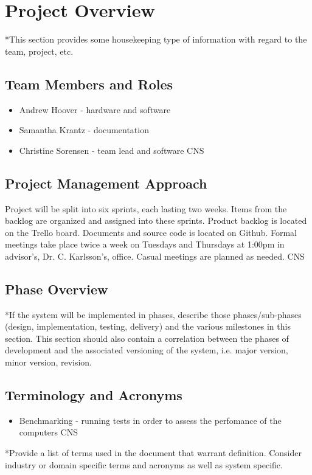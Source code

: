 

\chapter{Project Overview}
*This section provides some housekeeping type of information with regard to the 
team, project, etc. 



\section{Team Members and Roles}
\begin{itemize}
	\item Andrew Hoover - hardware and software
	\item Samantha Krantz - documentation
	\item Christine Sorensen - team lead and software CNS
\end{itemize}

\section{Project  Management Approach}
Project will be split into six sprints, each lasting two weeks. Items from the backlog are organized and assigned into these sprints. \newline \newline Product backlog is located on the Trello board. Documents and source code is located on Github. \newline \newline Formal meetings take place twice a week on Tuesdays and Thursdays at 1:00pm in advisor's, Dr. C. Karlsson's, office. Casual meetings are planned as needed. CNS

\section{Phase  Overview}


*If the system will be implemented in phases, describe those phases/sub-phases (design, 
implementation, testing, delivery) and the various milestones in this section. 
 This section should also contain a correlation between the phases of development 
and the associated versioning of the system, i.e. major version, minor version, 
revision. 

\section{Terminology and Acronyms}
\begin{itemize}
	\item Benchmarking - running tests in order to assess the perfomance of the computers CNS
\end{itemize}


*Provide a list of terms used in the document that warrant definition.  Consider 
industry or domain specific terms and acronyms as well as system specific. 
